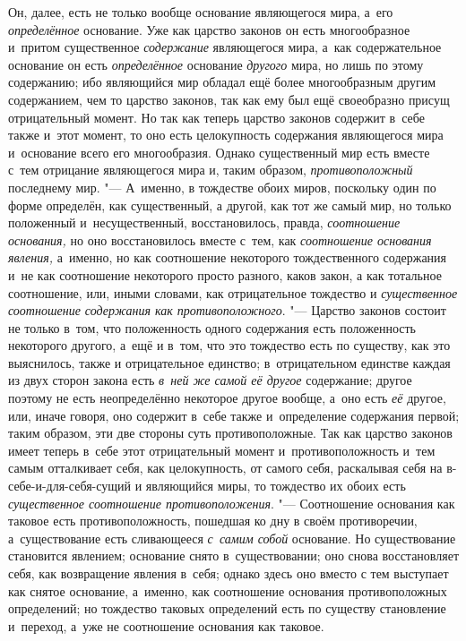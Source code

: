 Он, далее, есть не только вообще основание являющегося мира, а~его
{\em определённое} основание. Уже как царство законов
он есть многообразное и~притом существенное
{\em содержание} являющегося мира, а~как содержательное
основание он есть {\em определённое} основание
{\em другого} мира, но лишь по этому содержанию; ибо
являющийся мир обладал ещё более многообразным другим содержанием, чем то
царство законов, так как ему был ещё своеобразно присущ отрицательный
момент. Но так как теперь царство законов содержит в~себе также и~этот
момент, то оно есть целокупность содержания являющегося мира и~основание
всего его многообразия. Однако существенный мир есть вместе с~тем отрицание
являющегося мира и, таким образом,
{\em противоположный} последнему мир. "--- А~именно, в
тождестве обоих миров, поскольку один по форме определён, как существенный,
а другой, как тот же самый мир, но только положенный и~несущественный,
восстановилось, правда, {\em соотношение основания,} но
оно восстановилось вместе с~тем, как {\em соотношение
основания явления,} а~именно, но как соотношение некоторого тождественного
содержания и~не как соотношение некоторого просто разного, каков закон, а
как тотальное соотношение, или, иными словами, как отрицательное тождество
и {\em существенное соотношение содержания как
противоположного}. "--- Царство законов состоит не только в~том, что
положенность одного содержания есть положенность некоторого другого, а~ещё
и в~том, что это тождество есть по существу, как это выяснилось, также и
отрицательное единство; в~отрицательном единстве каждая из двух сторон
закона есть {\em в~ней же самой её другое} содержание;
другое поэтому не есть неопределённо некоторое другое вообще, а~оно есть
{\em её} другое, или, иначе говоря, оно содержит в~себе
также и~определение содержания первой; таким образом, эти две стороны суть
противоположные. Так как царство законов имеет теперь в~себе этот
отрицательный момент и~противоположность и~тем самым отталкивает себя, как
целокупность, от самого себя, раскалывая себя на в-себе-и-для-себя-сущий и
являющийся миры, то тождество их обоих есть
{\em существенное соотношение противоположения}. "---
Соотношение основания как таковое есть противоположность, пошедшая ко дну в
своём противоречии, а~существование есть сливающееся
{\em с~самим собой} основание. Но существование
становится явлением; основание снято в~существовании; оно снова
восстановляет себя, как возвращение явления в~себя; однако здесь оно вместо
с тем выступает как снятое основание, а~именно, как соотношение основания
противоположных определений; но тождество таковых определений есть по
существу становление и~переход, а~уже не соотношение основания как таковое.

